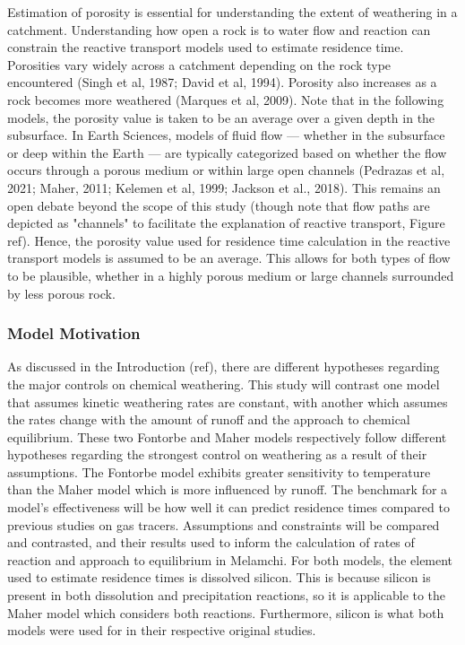 Estimation of porosity is essential for understanding the extent of weathering in a catchment. Understanding how open a rock is to water flow and reaction can constrain the reactive transport models used to estimate residence time. Porosities vary widely across a catchment depending on the rock type encountered (Singh et al, 1987; David et al, 1994). Porosity also increases as a rock becomes more weathered (Marques et al, 2009). Note that in the following models, the porosity value is taken to be an average over a given depth in the subsurface. In Earth Sciences, models of fluid flow — whether in the subsurface or deep within the Earth — are typically categorized based on whether the flow occurs through a porous medium or within large open channels (Pedrazas et al, 2021; Maher, 2011; Kelemen et al, 1999; Jackson et al., 2018). This remains an open debate beyond the scope of this study (though note that flow paths are depicted as "channels" to facilitate the explanation of reactive transport, Figure ref). Hence, the porosity value used for residence time calculation in the reactive transport models is assumed to be an average. This allows for both types of flow to be plausible, whether in a highly porous medium or large channels surrounded by less porous rock.


\subsubsection*{Model Motivation}

As discussed in the Introduction (ref), there are different hypotheses regarding the major controls on chemical weathering. This study will contrast one model that assumes kinetic weathering rates are constant, with another which assumes the rates change with the amount of runoff and the approach to chemical equilibrium. These two Fontorbe and Maher models respectively follow different hypotheses regarding the strongest control on weathering as a result of their assumptions. The Fontorbe model exhibits greater sensitivity to temperature than the Maher model which is more influenced by runoff. The benchmark for a model's effectiveness will be how well it can predict residence times compared to previous studies on gas tracers. Assumptions and constraints will be compared and contrasted, and their results used to inform the calculation of rates of reaction and approach to equilibrium in Melamchi. For both models, the element used to estimate residence times is dissolved silicon. This is because silicon is present in both dissolution and precipitation reactions, so it is applicable to the Maher model which considers both reactions. Furthermore, silicon is what both models were used for in their respective original studies.


